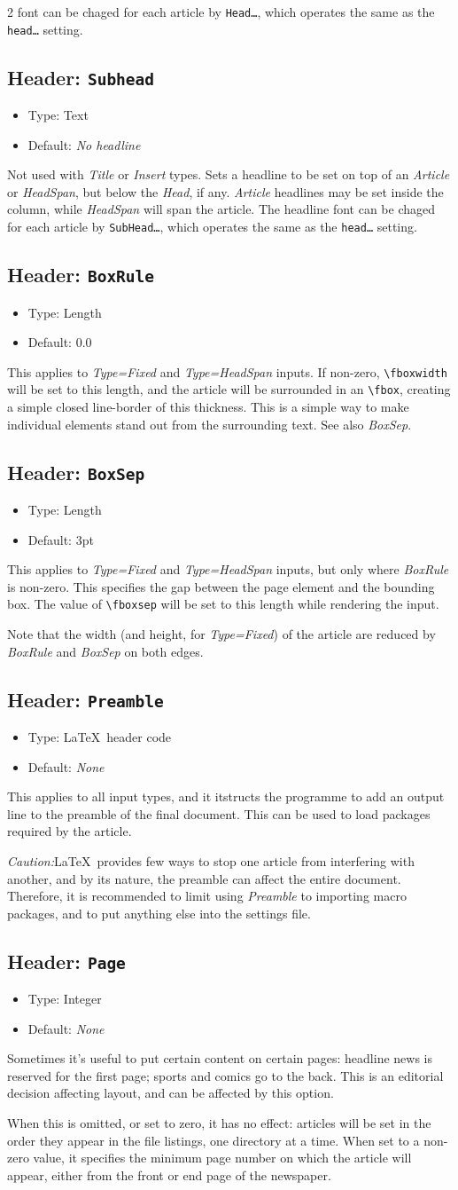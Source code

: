 \documentclass[a4paper,DIV=11]{scrartcl}
\newcommand{\property}[5]{
  \subsection{#1: \texttt{#2}}
  \begin{itemize}
  \item Type: #3
  \item Default: #4
  \end{itemize}
  #5
}
\newcommand{\header}{\property{Header}}
\begin{document}
\begin{multicols}{2}
{  font can be chaged for each article by \texttt{Head\dots}, which
  operates the same as the \texttt{head\dots} setting.
}
\header{Subhead}{Text}{\textit{No headline}}{
  Not used with \textit{Title} or \textit{Insert} types.
  Sets a headline to be set on top of an \textit{Article} or
  \textit{HeadSpan}, but below the \textit{Head}, if any.
  \textit{Article} headlines may be set inside the
  column, while \textit{HeadSpan} will span the article. The headline
  font can be chaged for each article by \texttt{SubHead\dots}, which
  operates the same as the \texttt{head\dots} setting.
}
\header{BoxRule}{Length}{0.0}{
  This applies to \textit{Type=Fixed} and \textit{Type=HeadSpan}
  inputs. If non-zero, \texttt{\textbackslash fboxwidth} will be set
  to this length, and the article will be surrounded in an
  \texttt{\textbackslash fbox}, creating a simple closed line-border
  of this thickness. This is a simple way to make individual elements
  stand out from the surrounding text. See also \textit{BoxSep}.
}
\header{BoxSep}{Length}{3pt}{
  This applies to \textit{Type=Fixed} and \textit{Type=HeadSpan}
  inputs, but only where \textit{BoxRule} is non-zero. This specifies
  the gap between the page element and the bounding box. The value of
  \texttt{\textbackslash fboxsep} will be set to this length while
  rendering the input.\par Note that the width (and height, for
  \textit{Type=Fixed}) of the article are reduced by \textit{BoxRule}
  and \textit{BoxSep} on both edges.
}
\header{Preamble}{\LaTeX\ header code}{\textit{None}}{
  This applies to all input types, and it itstructs the programme to
  add an output line to the preamble of the final document. This
  can be used to load packages required by the article.\par
  \textit{Caution:}\LaTeX\ provides few ways to stop one article from
  interfering with another, and by its nature, the preamble can affect
  the entire document. Therefore, it is recommended to limit using
  \textit{Preamble} to importing macro packages, and to put anything
  else into the settings file.
}
\header{Page}{Integer}{\textit{None}}{
  Sometimes it's useful to put certain content on certain pages:
  headline news is reserved for the first page; sports and comics go
  to the back. This is an editorial decision affecting layout, and can
  be affected by this option.
  
  When this is omitted, or set to zero, it has no effect: articles
  will be set in the order they appear in the file listings, one
  directory at a time. When set to a non-zero value, it specifies the
  minimum page number on which the article will appear, either from
  the front or end page of the newspaper.
  
}
\end{multicols}
\end{document}
